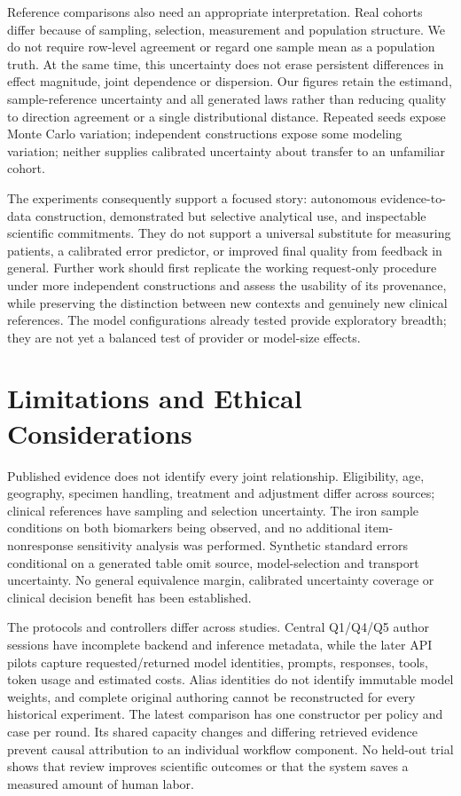 \documentclass[11pt,letterpaper]{article}
\begin{document}
Reference comparisons also need an appropriate interpretation. Real cohorts differ because of sampling, selection, measurement and population structure. We do not require row-level agreement or regard one sample mean as a population truth. At the same time, this uncertainty does not erase persistent differences in effect magnitude, joint dependence or dispersion. Our figures retain the estimand, sample-reference uncertainty and all generated laws rather than reducing quality to direction agreement or a single distributional distance. Repeated seeds expose Monte Carlo variation; independent constructions expose some modeling variation; neither supplies calibrated uncertainty about transfer to an unfamiliar cohort.


The experiments consequently support a focused story: autonomous evidence-to-data construction, demonstrated but selective analytical use, and inspectable scientific commitments. They do not support a universal substitute for measuring patients, a calibrated error predictor, or improved final quality from feedback in general. Further work should first replicate the working request-only procedure under more independent constructions and assess the usability of its provenance, while preserving the distinction between new contexts and genuinely new clinical references. The model configurations already tested provide exploratory breadth; they are not yet a balanced test of provider or model-size effects.


\section{Limitations and Ethical Considerations}

Published evidence does not identify every joint relationship. Eligibility, age, geography, specimen handling, treatment and adjustment differ across sources; clinical references have sampling and selection uncertainty. The iron sample conditions on both biomarkers being observed, and no additional item-nonresponse sensitivity analysis was performed. Synthetic standard errors conditional on a generated table omit source, model-selection and transport uncertainty. No general equivalence margin, calibrated uncertainty coverage or clinical decision benefit has been established.


The protocols and controllers differ across studies. Central Q1/\allowbreak{}Q4/\allowbreak{}Q5 author sessions have incomplete backend and inference metadata, while the later API pilots capture requested/\allowbreak{}returned model identities, prompts, responses, tools, token usage and estimated costs. Alias identities do not identify immutable model weights, and complete original authoring cannot be reconstructed for every historical experiment. The latest comparison has one constructor per policy and case per round. Its shared capacity changes and differing retrieved evidence prevent causal attribution to an individual workflow component. No held-out trial shows that review improves scientific outcomes or that the system saves a measured amount of human labor.
\end{document}
